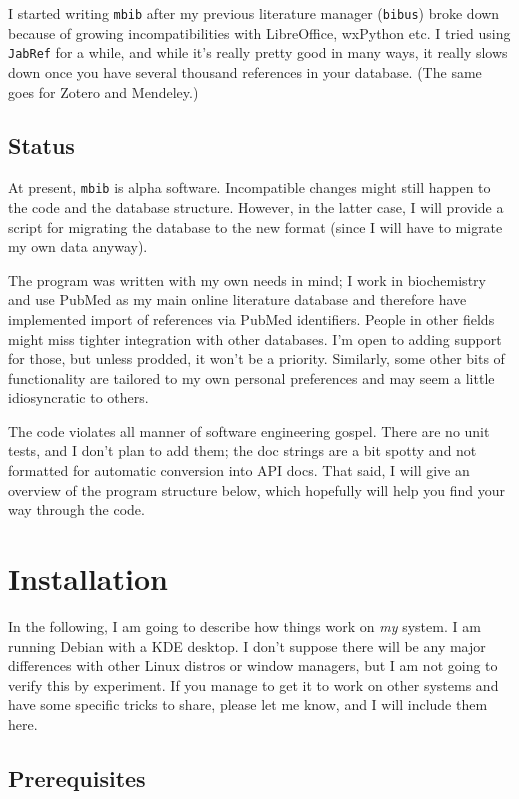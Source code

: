 \documentclass[10pt]{article}
\newcommand{\mbib}{\texttt{mbib}\xspace}
\newcommand{\jabref}{\texttt{JabRef}\xspace}
\begin{document}
I started writing \mbib after my previous literature manager (\texttt{bibus}) broke down because of growing incompatibilities with LibreOffice, wxPython etc. I tried using \jabref for a while, and while it's really pretty good in many ways, it really slows down once you have several thousand references in your database. (The same goes for Zotero and Mendeley.)

\subsection{Status}

At present, \mbib is alpha software. Incompatible changes might still happen to the code and the database structure. However, in the latter case, I will provide a script for migrating the database to the new format (since I will have to migrate my own data anyway). 

The program was written with my own needs in mind; I work in biochemistry and use PubMed as my main online literature database and therefore have implemented import of references via PubMed identifiers. People in other fields might miss tighter integration with other databases. I'm open to adding support for those, but unless prodded, it won't be a priority. Similarly, some other bits of functionality are tailored to my own personal preferences and may seem a little idiosyncratic to others.

The code violates all manner of software engineering gospel. There are no unit tests, and I don't plan to add them; the doc strings are a bit spotty and not formatted for automatic conversion into API docs. That said, I will give an overview of the program structure below, which hopefully will help you find your way through the code. 

\section{Installation}

In the following, I am going to describe how things work on \emph{my} system. I am running Debian with a KDE desktop. I don't suppose there will be any major differences with other Linux distros or window managers, but I am not going to verify this by experiment. If you manage to get it to work on other systems and have some specific tricks to share, please let me know, and I will include them here.

\subsection{Prerequisites}
\end{document}
